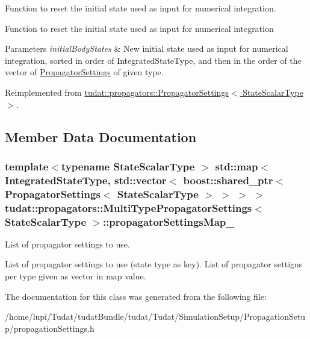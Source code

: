 Function to reset the initial state used as input for numerical integration. 

Function to reset the initial state used as input for numerical integration 
\begin{DoxyParams}{Parameters}
{\em initial\+Body\+States} & New initial state used as input for numerical integration, sorted in order of Integrated\+State\+Type, and then in the order of the vector of \hyperlink{classtudat_1_1propagators_1_1PropagatorSettings}{Propagator\+Settings} of given type. \\
\hline
\end{DoxyParams}


Reimplemented from \hyperlink{classtudat_1_1propagators_1_1PropagatorSettings_a372bd085a2032236531536f5d8c46fb3}{tudat\+::propagators\+::\+Propagator\+Settings$<$ State\+Scalar\+Type $>$}.



\subsection{Member Data Documentation}
\subsubsection[{\texorpdfstring{propagator\+Settings\+Map\+\_\+}{propagatorSettingsMap_}}]{\setlength{\rightskip}{0pt plus 5cm}template$<$typename State\+Scalar\+Type $>$ std\+::map$<$ Integrated\+State\+Type, std\+::vector$<$ boost\+::shared\+\_\+ptr$<$ {\bf Propagator\+Settings}$<$ State\+Scalar\+Type $>$ $>$ $>$ $>$ {\bf tudat\+::propagators\+::\+Multi\+Type\+Propagator\+Settings}$<$ State\+Scalar\+Type $>$\+::propagator\+Settings\+Map\+\_\+}\hypertarget{classtudat_1_1propagators_1_1MultiTypePropagatorSettings_a82254033e0d25850b5e82b4846bb733c}{}\label{classtudat_1_1propagators_1_1MultiTypePropagatorSettings_a82254033e0d25850b5e82b4846bb733c}


List of propagator settings to use. 

List of propagator settings to use (state type as key). List of propagator settigns per type given as vector in map value. 

The documentation for this class was generated from the following file\+:\begin{DoxyCompactItemize}
\item 
/home/lupi/\+Tudat/tudat\+Bundle/tudat/\+Tudat/\+Simulation\+Setup/\+Propagation\+Setup/propagation\+Settings.\+h\end{DoxyCompactItemize}
